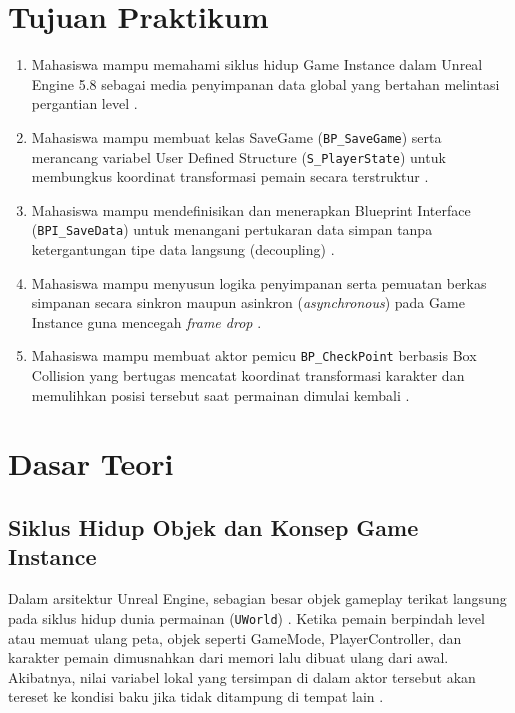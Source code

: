 \documentclass[a4paper,oneside,12pt]{report}
\begin{document}
\thispagestyle{empty}
\clearpage
{}
\thispagestyle{empty}

\tableofcontents
\clearpage

\setcounter{page}{3}

\chapter[Tujuan Praktikum]{Tujuan Praktikum}
\begin{enumerate}
    \item Mahasiswa mampu memahami siklus hidup Game Instance dalam Unreal Engine 5.8 sebagai media penyimpanan data global yang bertahan melintasi pergantian level \cite{modul5,epic-gameinstance}.
    \item Mahasiswa mampu membuat kelas SaveGame (\texttt{BP\_SaveGame}) serta merancang variabel User Defined Structure (\texttt{S\_PlayerState}) untuk membungkus koordinat transformasi pemain secara terstruktur \cite{modul5,epic-savegame,epic-structs}.
    \item Mahasiswa mampu mendefinisikan dan menerapkan Blueprint Interface (\texttt{BPI\_SaveData}) untuk menangani pertukaran data simpan tanpa ketergantungan tipe data langsung (decoupling) \cite{modul5,epic-interface}.
    \item Mahasiswa mampu menyusun logika penyimpanan serta pemuatan berkas simpanan secara sinkron maupun asinkron (\textit{asynchronous}) pada Game Instance guna mencegah \textit{frame drop} \cite{modul5,epic-async}.
    \item Mahasiswa mampu membuat aktor pemicu \texttt{BP\_CheckPoint} berbasis Box Collision yang bertugas mencatat koordinat transformasi karakter dan memulihkan posisi tersebut saat permainan dimulai kembali \cite{modul5,epic-collision}.
\end{enumerate}
\clearpage

\chapter{Dasar Teori}

\section{Siklus Hidup Objek dan Konsep Game Instance}
Dalam arsitektur Unreal Engine, sebagian besar objek gameplay terikat langsung pada siklus hidup dunia permainan (\texttt{UWorld}) \cite{epic-gameinstance}. Ketika pemain berpindah level atau memuat ulang peta, objek seperti GameMode, PlayerController, dan karakter pemain dimusnahkan dari memori lalu dibuat ulang dari awal. Akibatnya, nilai variabel lokal yang tersimpan di dalam aktor tersebut akan tereset ke kondisi baku jika tidak ditampung di tempat lain \cite{epic-forum-lifecycle}.
\end{document}
